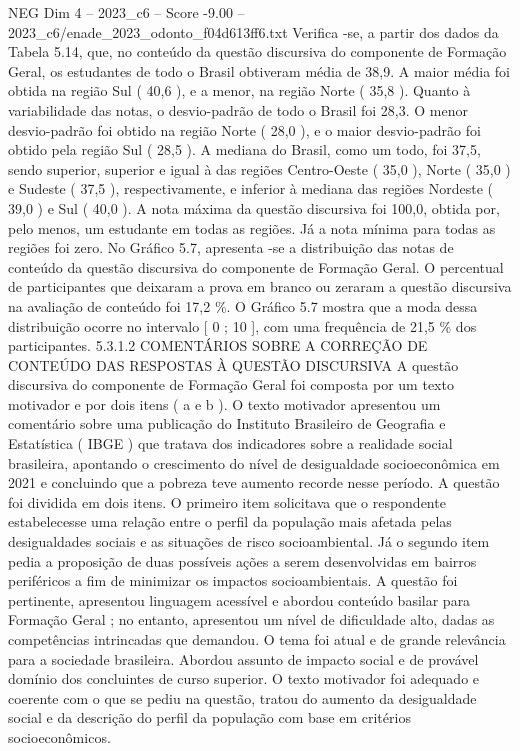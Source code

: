 \begin{textsample}{NEG Dim 4 – 2023\_c6 – Score -9.00 – 2023\_c6/enade\_2023\_odonto\_f04d613ff6.txt}
Verifica -se, a partir dos dados da Tabela 5.14, que, no conteúdo da questão discursiva do componente de Formação Geral, os estudantes de todo o Brasil obtiveram média de 38,9.
A maior média foi obtida na região Sul ( 40,6 ), e a menor, na região Norte ( 35,8 ).
Quanto à variabilidade das notas, o desvio-padrão de todo o Brasil foi 28,3.
O menor desvio-padrão foi obtido na região Norte ( 28,0 ), e o maior desvio-padrão foi obtido pela região Sul ( 28,5 ).
A mediana do Brasil, como um todo, foi 37,5, sendo superior, superior e igual à das regiões Centro-Oeste ( 35,0 ), Norte ( 35,0 ) e Sudeste ( 37,5 ), respectivamente, e inferior à mediana das regiões Nordeste ( 39,0 ) e Sul ( 40,0 ).
A nota máxima da questão discursiva foi 100,0, obtida por, pelo menos, um estudante em todas as regiões.
Já a nota mínima para todas as regiões foi zero.
No Gráfico 5.7, apresenta -se a distribuição das notas de conteúdo da questão discursiva do componente de Formação Geral.
O percentual de participantes que deixaram a prova em branco ou zeraram a questão discursiva na avaliação de conteúdo foi 17,2 \%.
O Gráfico 5.7 mostra que a moda dessa distribuição ocorre no intervalo [ 0 ; 10 ], com uma frequência de 21,5 \% dos participantes. 5.3.1.2 COMENTÁRIOS SOBRE A CORREÇÃO DE CONTEÚDO DAS RESPOSTAS À QUESTÃO DISCURSIVA A questão discursiva do componente de Formação Geral foi composta por um texto motivador e por dois itens ( a e b ).
O texto motivador apresentou um comentário sobre uma publicação do Instituto Brasileiro de Geografia e Estatística ( IBGE ) que tratava dos indicadores sobre a realidade social brasileira, apontando o crescimento do nível de desigualdade socioeconômica em 2021 e concluindo que a pobreza teve aumento recorde nesse período.
A questão foi dividida em dois itens.
O primeiro item solicitava que o respondente estabelecesse uma relação entre o perfil da população mais afetada pelas desigualdades sociais e as situações de risco socioambiental.
Já o segundo item pedia a proposição de duas possíveis ações a serem desenvolvidas em bairros periféricos a fim de minimizar os impactos socioambientais.
A questão foi pertinente, apresentou linguagem acessível e abordou conteúdo basilar para Formação Geral ; no entanto, apresentou um nível de dificuldade alto, dadas as competências intrincadas que demandou.
O tema foi atual e de grande relevância para a sociedade brasileira.
Abordou assunto de impacto social e de provável domínio dos concluintes de curso superior.
O texto motivador foi adequado e coerente com o que se pediu na questão, tratou do aumento da desigualdade social e da descrição do perfil da população com base em critérios socioeconômicos.

\end{textsample}
